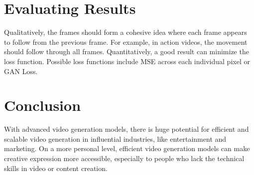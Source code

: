\documentclass[11pt,a4paper]{article}
\begin{document}
\section{Evaluating Results}

Qualitatively, the frames should form a cohesive idea where each frame appears to follow from the previous frame. For example, in action videos, the movement should follow through all frames. Quantitatively, a good result can minimize the loss function. Possible loss functions include MSE across each individual pixel or GAN Loss.


\section{Conclusion}

With advanced video generation models, there is huge potential for efficient and scalable video generation in influential industries, like entertainment and marketing. On a more personal level, efficient video generation models can make creative expression more accessible, especially to people who lack the technical skills in video or content creation.




\end{document}
